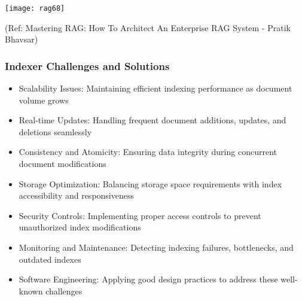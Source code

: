 \begin{frame}[fragile]\frametitle{}

	\begin{center}
	\texttt{[image: rag68]}
	
	{\tiny (Ref: Mastering RAG: How To Architect An Enterprise RAG System - Pratik Bhavsar)}
	
	\end{center}
	
	
\end{frame}


\begin{frame}[fragile]\frametitle{Indexer Challenges and Solutions}
      \begin{itemize}
        \item Scalability Issues: Maintaining efficient indexing performance as document volume grows
        \item Real-time Updates: Handling frequent document additions, updates, and deletions seamlessly
        \item Consistency and Atomicity: Ensuring data integrity during concurrent document modifications
        \item Storage Optimization: Balancing storage space requirements with index accessibility and responsiveness
        \item Security Controls: Implementing proper access controls to prevent unauthorized index modifications
        \item Monitoring and Maintenance: Detecting indexing failures, bottlenecks, and outdated indexes
        \item Software Engineering: Applying good design practices to address these well-known challenges
      \end{itemize}
\end{frame}

